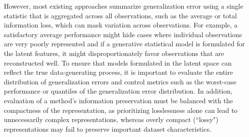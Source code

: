 However, most existing approaches summarize generalization error using a single statistic that is aggregated across all observations, such as the average or total information loss, which can mask variation across observations.
For example, a satisfactory average performance might hide cases where individual observations are very poorly represented and if a generative statistical model is formulated for the latent features, it might disproportionately favor observations that are reconstructed well.
To ensure that models formulated in the latent space can reflect the true data-generating process, it is important to evaluate the entire distribution of generalization errors and control metrics such as the worst-case performance or quantiles of the generalization error distribution.
In addition, evaluation of a method's information preservation must be balanced with the compactness of the representation, as prioritizing losslessness alone can lead to unnecessarily complex representations, whereas overly compact (``lossy") representations may fail to preserve important dataset characteristics.

